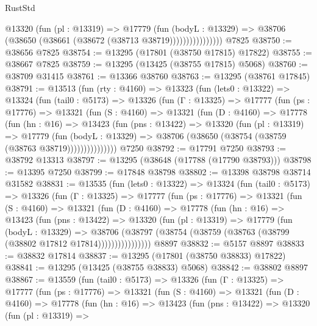 \begin{lexlean}{RustStd}
\begin{coremodule}
                      @13320
                        (fun (pl : @13319) =>
                        @17779
                          (fun (bodyL : @13329) =>
                          @38706 (@38650 (@38661 (@38672 (@38713 @38719))))))))))))))))
    @7825
@38750 := @38656 @7825
@38754 := @13295 (@17801 (@38750 @17815) @17822)
@38755 := @38667 @7825
@38759 := @13295 (@13425 (@38755 @17815) @5068)
@38760 := @38709 @31415
@38761 := @13366 @38760
@38763 := @13295 (@38761 @17845)
@38791 := @13513
    (fun (rty : @4160) =>
    @13323
      (fun (lets0 : @13322) =>
      @13324
        (fun (tail0 : @5173) =>
        @13326
          (fun (Γ : @13325) =>
          @17777
            (fun (ps : @17776) =>
            @13321
              (fun (S : @4160) =>
              @13321
                (fun (D : @4160) =>
                @17778
                  (fun (hn : @16) =>
                  @13423
                    (fun (pns : @13422) =>
                    @13320
                      (fun (pl : @13319) =>
                      @17779
                        (fun (bodyL : @13329) =>
                        @38706 (@38650 (@38754 (@38759 (@38763 @38719)))))))))))))))
    @7250
@38792 := @17791 @7250
@38793 := @38792 @13313
@38797 := @13295 (@38648 (@17788 (@17790 @38793)))
@38798 := @13395 @7250
@38799 := @17848 @38798
@38802 := @13398 @38798 @38714 @31582
@38831 := @13535
    (fun (lets0 : @13322) =>
    @13324
      (fun (tail0 : @5173) =>
      @13326
        (fun (Γ : @13325) =>
        @17777
          (fun (ps : @17776) =>
          @13321
            (fun (S : @4160) =>
            @13321
              (fun (D : @4160) =>
              @17778
                (fun (hn : @16) =>
                @13423
                  (fun (pns : @13422) =>
                  @13320
                    (fun (pl : @13319) =>
                    @17779
                      (fun (bodyL : @13329) =>
                      @38706
                        (@38797
                          (@38754 (@38759 (@38763 (@38799 (@38802 @17812 @17814))))))))))))))))
    @8897
@38832 := @5157 @8897
@38833 := @38832 @17814
@38837 := @13295 (@17801 (@38750 @38833) @17822)
@38841 := @13295 (@13425 (@38755 @38833) @5068)
@38842 := @38802 @8897
@38867 := @13559
    (fun (tail0 : @5173) =>
    @13326
      (fun (Γ : @13325) =>
      @17777
        (fun (ps : @17776) =>
        @13321
          (fun (S : @4160) =>
          @13321
            (fun (D : @4160) =>
            @17778
              (fun (hn : @16) =>
              @13423
                (fun (pns : @13422) =>
                @13320
                  (fun (pl : @13319) =>

\end{coremodule}
\end{lexlean}
